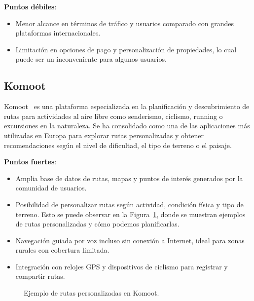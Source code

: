 \textbf{Puntos débiles}:
\begin{itemize}
    \item Menor alcance en términos de tráfico y usuarios comparado con grandes plataformas internacionales.
    \item Limitación en opciones de pago y personalización de propiedades, lo cual puede ser un inconveniente para algunos usuarios.
\end{itemize}
\subsection{Komoot}
Komoot~\cite{komoot} es una plataforma especializada en la planificación y descubrimiento de rutas para actividades al aire libre como senderismo, ciclismo, running o excursiones en la naturaleza. Se ha consolidado como una de las aplicaciones más utilizadas en Europa para explorar rutas personalizadas y obtener recomendaciones según el nivel de dificultad, el tipo de terreno o el paisaje.

\textbf{Puntos fuertes}:
\begin{itemize}
\item Amplia base de datos de rutas, mapas y puntos de interés generados por la comunidad de usuarios.
\item Posibilidad de personalizar rutas según actividad, condición física y tipo de terreno. Esto se puede observar en la Figura~\ref{fig:komoot-rutas}, donde se muestran ejemplos de rutas personalizadas y cómo podemos planificarlas.            
\item Navegación guiada por voz incluso sin conexión a Internet, ideal para zonas rurales con cobertura limitada.
\item Integración con relojes GPS y dispositivos de ciclismo para registrar y compartir rutas.
\end{itemize}

\begin{figure}[h!tb]
    \centering
    \setlength{\fboxsep}{15pt}%
    \setlength{\fboxrule}{0.5pt}%
    \caption{Ejemplo de rutas personalizadas en Komoot.}
    \label{fig:komoot-rutas}        
\end{figure}

